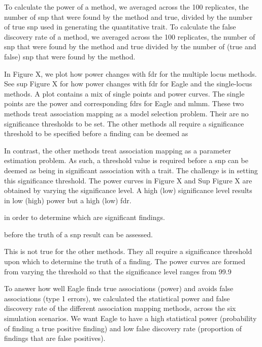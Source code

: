 \documentclass{nature}
\begin{document}
To calculate the power of a method, we averaged across the 100 replicates, the number of snp that were found by the method and true, divided by the number of true snp used in generating the quantitative trait. To calculate the false discovery rate of a method, we averaged across the 100 replicates, the number of snp that were found by the method and true divided by the number of (true and false) snp that were found by the method.

In Figure X, we plot how power changes with fdr for the multiple locus methods. See sup Figure X for how power changes with fdr for Eagle and 
the single-locus methods.  A plot contains a mix of single points and power curves. The single points are the power and corresponding fdrs for Eagle and mlmm. These two methods treat association mapping as a model selection problem. Their are no significance thresholds to be set. The other 
methods all require a significance threshold to be specified before a finding can be deemed as 

In contrast, the other methods treat association mapping as a parameter estimation problem. As such, a threshold value is required before a snp 
can be deemed as being in significant association with a trait.  The challenge is in setting this significance threshold. The power curves in Figure 
X and Sup Figure X  are obtained by varying the significance level. A high (low) significance level results in low (high) power but a high (low) fdr.  






 in order to determine which are significant findings. 


before the truth of a snp result can be assessed.  


This is not true for the other methods. They all require a significance threshold upon which to determine the truth of a finding. The power curves are formed from varying the threshold so that the significance level ranges from 99.9%









To answer how well Eagle finds true associations (power) and avoids 
false associations (type 1 errors), we calculated the statistical power and false discovery rate of the different 
association mapping methods, across the six simulation scenarios.  We want Eagle to have a high statistical power 
(probability of finding a true positive finding) and low false discovery rate (proportion of findings that are false positives). 
\end{document}
